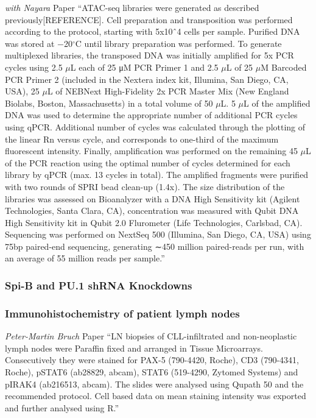 \documentclass[11pt, a4paper, twosided]{book}
\begin{document}
\emph{with Nayara} Paper
``ATAC-seq libraries were generated as described previously{[}REFERENCE{]}. Cell preparation and transposition was performed according to the protocol, starting with 5x10ˆ4 cells per sample. Purified DNA was stored at −20\(^\circ\)C until library preparation was performed. To generate multiplexed libraries, the transposed DNA was initially amplified for 5x PCR cycles using 2.5 \(\mu\)L each of 25 μM PCR Primer 1 and 2.5 \(\mu\)L of 25 \(\mu\)M Barcoded PCR Primer 2 (included in the Nextera index kit, Illumina, San Diego, CA, USA), 25 \(\mu\)L of NEBNext High-Fidelity 2x PCR Master Mix (New England Biolabs, Boston, Massachusetts) in a total volume of 50 \(\mu\)L. 5 \(\mu\)L of the amplified DNA was used to determine the appropriate number of additional PCR cycles using qPCR. Additional number of cycles was calculated through the plotting of the linear Rn versus cycle, and corresponds to one-third of the maximum fluorescent intensity. Finally, amplification was performed on the remaining 45 \(\mu\)L of the PCR reaction using the optimal number of cycles determined for each library by qPCR (max. 13 cycles in total). The amplified fragments were purified with two rounds of SPRI bead clean-up (1.4x). The size distribution of the libraries was assessed on Bioanalyzer with a DNA High Sensitivity kit (Agilent Technologies, Santa Clara, CA), concentration was measured with Qubit DNA High Sensitivity kit in Qubit 2.0 Flurometer (Life Technologies, Carlsbad, CA). Sequencing was performed on NextSeq 500 (Illumina, San Diego, CA, USA) using 75bp paired-end sequencing, generating ∼450 million paired-reads per run, with an average of 55 million reads per sample.''

\hypertarget{spi-b-and-pu.1-shrna-knockdowns}{%
\subsubsection{Spi-B and PU.1 shRNA Knockdowns}\label{spi-b-and-pu.1-shrna-knockdowns}}

\hypertarget{immunohistochemistry-of-patient-lymph-nodes}{%
\subsubsection{Immunohistochemistry of patient lymph nodes}\label{immunohistochemistry-of-patient-lymph-nodes}}

\emph{Peter-Martin Bruch} Paper
``LN biopsies of CLL-infiltrated and non-neoplastic lymph nodes were Paraffin fixed and arranged in Tissue Microarrays. Consecutively they were stained for PAX-5 (790-4420, Roche), CD3 (790-4341, Roche), pSTAT6 (ab28829, abcam), STAT6 (519-4290, Zytomed Systems) and pIRAK4 (ab216513, abcam). The slides were analysed using Qupath 50 and the recommended protocol. Cell based data on mean staining intensity was exported and further analysed using R.''
\end{document}
